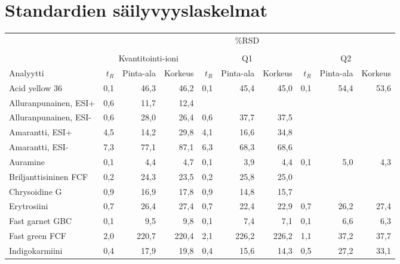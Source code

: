 \chapter{Standardien säilyvyyslaskelmat}\label{appx:storage}
\begin{table}[htbp]
  \centering
    \begin{tabular}{lrrrrrrrrr}
    \toprule
          & \multicolumn{9}{c}{\%RSD} \\
    \cline{2-10} \\
          & \multicolumn{3}{c}{Kvantitointi-ioni} & \multicolumn{3}{c}{Q1} & \multicolumn{3}{c}{Q2} \\
    \cmidrule(r){2-4} \cmidrule(r){5-7} \cmidrule(r){8-10}
    Analyytti & $t_R$   & Pinta-ala & Korkeus & $t_R$   & Pinta-ala & Korkeus & $t_R$   & Pinta-ala & Korkeus \\
    \midrule
    Acid yellow 36 & 0,1   & 46,3  & 46,2  & 0,1   & 45,4  & 45,0  & 0,1   & 54,4  & 53,6 \\
    Alluranpunainen, ESI+ & 0,6   & 11,7  & 12,4  &       &       &       &       &       &  \\
    Alluranpunainen, ESI- & 0,6   & 28,0  & 26,4  & 0,6   & 37,7  & 37,5  &       &       &  \\
    Amarantti, ESI+ & 4,5   & 14,2  & 29,8  & 4,1   & 16,6  & 34,8  &       &       &  \\
    Amarantti, ESI- & 7,3   & 77,1  & 87,1  & 6,3   & 68,3  & 68,6  &       &       &  \\
    Auramine & 0,1   & 4,4   & 4,7   & 0,1   & 3,9   & 4,4   & 0,1   & 5,0   & 4,3 \\
    Briljanttisininen FCF & 0,2   & 24,3  & 23,5  & 0,2   & 25,8  & 25,0  &       &       &  \\
    Chrysoidine G & 0,9   & 16,9  & 17,8  & 0,9   & 14,8  & 15,7  &       &       &  \\
    Erytrosiini & 0,7   & 26,4  & 27,4  & 0,7   & 22,4  & 22,9  & 0,7   & 26,2  & 27,4 \\
    Fast garnet GBC & 0,1   & 9,5   & 9,8   & 0,1   & 7,4   & 7,1   & 0,1   & 6,6   & 6,3 \\
    Fast green FCF & 2,0   & 220,7 & 220,4 & 2,1   & 226,2 & 226,2 & 1,1   & 37,2  & 37,7 \\
    Indigokarmiini & 0,4   & 17,9  & 19,8  & 0,4   & 15,6  & 14,3  & 0,5   & 27,2  & 33,1 \\

\end{tabular}
\end{table}
